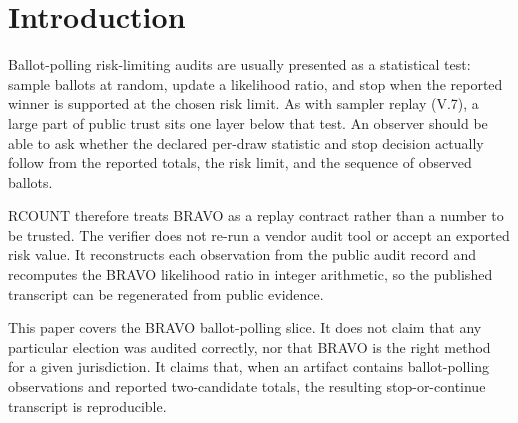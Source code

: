 \section{Introduction}

Ballot-polling risk-limiting audits are usually presented as a statistical test:
sample ballots at random, update a likelihood ratio, and stop when the reported
winner is supported at the chosen risk limit. As with sampler replay (V.7), a
large part of public trust sits one layer below that test. An observer should be
able to ask whether the declared per-draw statistic and stop decision actually
follow from the reported totals, the risk limit, and the sequence of observed
ballots.

RCOUNT therefore treats BRAVO as a replay contract rather than a number to be
trusted. The verifier does not re-run a vendor audit tool or accept an exported
risk value. It reconstructs each observation from the public audit record and
recomputes the BRAVO likelihood ratio in integer arithmetic, so the published
transcript can be regenerated from public evidence.

This paper covers the BRAVO ballot-polling slice. It does not claim that any
particular election was audited correctly, nor that BRAVO is the right method
for a given jurisdiction. It claims that, when an artifact contains ballot-polling
observations and reported two-candidate totals, the resulting stop-or-continue
transcript is reproducible.
